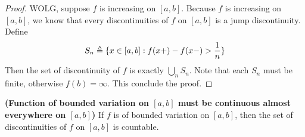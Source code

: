 \documentclass{report}
\begin{document}
\begin{proof}
WOLG, suppose $f$ is increasing on  $[a,b]$. Because $f$ is increasing on $[a,b]$, we know that every discontinuities of $f$ on  $[a,b]$ is a jump discontinuity. Define 
\begin{align*}
S_n\triangleq \{ x\in [a,b]: f(x+)-f(x-)>\frac{1}{n} \}
\end{align*}
Then the set of discontinuity of $f$ is exactly  $\bigcup_n S_n$. Note that each $S_n$ must be finite, otherwise $f(b)=\infty$. This conclude the proof.
\end{proof}
\begin{corollary}
\label{Fmo}
\textbf{(Function of bounded variation on $[a,b]$ must be continuous almost everywhere on $[a,b]$)} If $f$ is of bounded variation on $[a,b]$, then the set of discontinuities of $f$ on $[a,b]$ is countable.
\end{corollary}
\end{document}
